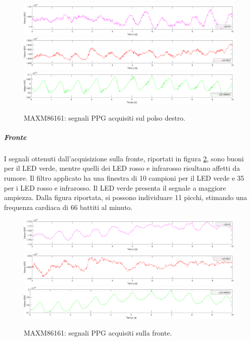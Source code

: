 \begin{figure}[h]
	\centering
	\includegraphics[width=1\linewidth]{ImageFiles/Misure Preliminari/Soggetto 2/maxm86161/polso_inferiore_ir_moving_avg}
	\includegraphics[width=1\linewidth]{ImageFiles/Misure Preliminari/Soggetto 2/maxm86161/polso_inferiore_red_moving_avg}
	\includegraphics[width=1\linewidth]{ImageFiles/Misure Preliminari/Soggetto 2/maxm86161/polso_inferiore_green_moving_avg}
	\caption{MAXM86161: segnali PPG acquisiti sul polso destro.}
	\label{fig:soggetto2_MAXM86161_polso}
\end{figure}

\clearpage

\subparagraph{Fronte}
I segnali ottenuti dall'acquisizione sulla fronte, riportati in figura \ref{fig:soggetto2_MAXM86161_fronte}, sono buoni per il LED verde, mentre quelli dei LED rosso e infrarosso risultano affetti da rumore. Il filtro applicato ha una finestra di 10 campioni per il LED verde e 35 per i LED rosso e infrarosso. Il LED verde presenta il segnale a maggiore ampiezza. Dalla figura riportata, si possono individuare 11 picchi, stimando una frequenza cardiaca di 66 battiti al minuto.

\begin{figure}[h]
	\centering
	\includegraphics[width=1\linewidth]{ImageFiles/Misure Preliminari/Soggetto 2/maxm86161/fronte_ir_moving_avg}
	\includegraphics[width=1\linewidth]{ImageFiles/Misure Preliminari/Soggetto 2/maxm86161/fronte_red_moving_avg}
	\includegraphics[width=1\linewidth]{ImageFiles/Misure Preliminari/Soggetto 2/maxm86161/fronte_green_moving_avg}
	\caption{MAXM86161: segnali PPG acquisiti sulla fronte.}
	\label{fig:soggetto2_MAXM86161_fronte}
\end{figure}


\clearpage
